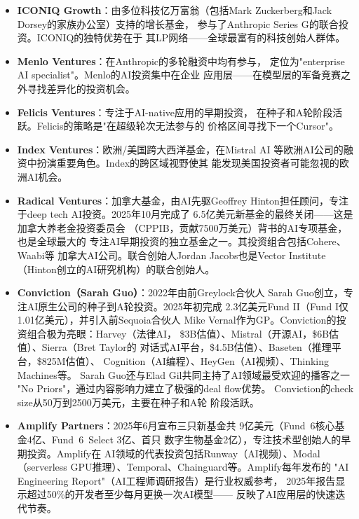 \begin{itemize}
  \item \textbf{ICONIQ Growth}：由多位科技亿万富翁（包括Mark
    Zuckerberg和Jack Dorsey的家族办公室）支持的增长基金，
    参与了Anthropic Series G的联合投资。ICONIQ的独特优势在于
    其LP网络——全球最富有的科技创始人群体。
  \item \textbf{Menlo Ventures}：在Anthropic的多轮融资中均有参与，
    定位为"enterprise AI specialist"。Menlo的AI投资集中在企业
    应用层——在模型层的军备竞赛之外寻找差异化的投资机会。
  \item \textbf{Felicis Ventures}：专注于AI-native应用的早期投资，
    在种子和A轮阶段活跃。Felicis的策略是"在超级轮次无法参与的
    价格区间寻找下一个Cursor"。
  \item \textbf{Index Ventures}：欧洲/美国跨大西洋基金，在Mistral AI
    等欧洲AI公司的融资中扮演重要角色。Index的跨区域视野使其
    能发现美国投资者可能忽视的欧洲AI机会。
  \item \textbf{Radical Ventures}：加拿大基金，由AI先驱Geoffrey
    Hinton担任顾问，专注于deep tech AI投资。2025年10月完成了
    6.5亿美元新基金的最终关闭——这是加拿大养老金投资委员会
    （CPPIB，贡献7500万美元）背书的AI专项基金，也是全球最大的
    专注AI早期投资的独立基金之一。其投资组合包括Cohere、Waabi等
    加拿大AI公司。联合创始人Jordan Jacobs也是Vector Institute
    （Hinton创立的AI研究机构）的联合创始人。
  \item \textbf{Conviction（Sarah Guo）}：2022年由前Greylock合伙人
    Sarah Guo创立，专注AI原生公司的种子到A轮投资。2025年初完成
    2.3亿美元Fund II（Fund I仅1.01亿美元），并引入前Sequoia合伙人
    Mike Vernal作为GP。Conviction的投资组合极为亮眼：Harvey（法律AI，
    \$3B估值）、Mistral（开源AI，\$6B估值）、Sierra（Bret Taylor的
    对话式AI平台，\$4.5B估值）、Baseten（推理平台，\$825M估值）、
    Cognition（AI编程）、HeyGen（AI视频）、Thinking Machines等。
    Sarah Guo还与Elad Gil共同主持了AI领域最受欢迎的播客之一
    "No Priors"，通过内容影响力建立了极强的deal flow优势。
    Conviction的check size从50万到2500万美元，主要在种子和A轮
    阶段活跃。
  \item \textbf{Amplify Partners}：2025年6月宣布三只新基金共
    9亿美元（Fund~6核心基金4亿、Fund~6~Select 3亿、首只
    数字生物基金2亿），专注技术型创始人的早期投资。Amplify在
    AI领域的代表投资包括Runway（AI视频）、Modal（serverless
    GPU推理）、Temporal、Chainguard等。Amplify每年发布的
    "AI Engineering Report"（AI工程师调研报告）是行业权威参考，
    2025年报告显示超过50\%的开发者至少每月更换一次AI模型——
    反映了AI应用层的快速迭代节奏。
\end{itemize}

